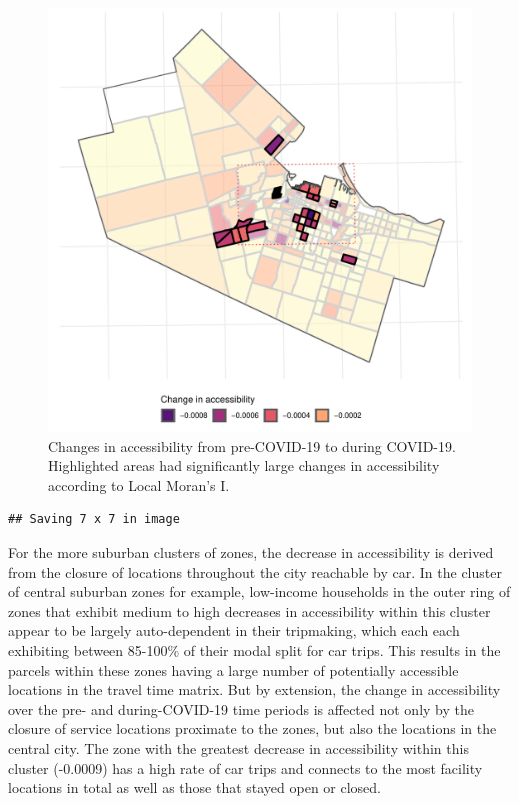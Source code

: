 \documentclass[]{elsarticle} %
\begin{document}
\begin{figure}
\includegraphics[width=1\linewidth]{Accessibility-Foodbanks-Hamilton_files/figure-latex/plot-local-i-1} \caption{\label{fig:accessibility-changes-with-local-i}Changes in accessibility from pre-COVID-19 to during COVID-19. Highlighted areas had significantly large changes in accessibility according to Local Moran's I.}\label{fig:plot-local-i}
\end{figure}

\begin{verbatim}
## Saving 7 x 7 in image
\end{verbatim}

For the more suburban clusters of zones, the decrease in accessibility
is derived from the closure of locations throughout the city reachable
by car. In the cluster of central suburban zones for example, low-income
households in the outer ring of zones that exhibit medium to high
decreases in accessibility within this cluster appear to be largely
auto-dependent in their tripmaking, which each each exhibiting between
85-100\% of their modal split for car trips. This results in the parcels
within these zones having a large number of potentially accessible
locations in the travel time matrix. But by extension, the change in
accessibility over the pre- and during-COVID-19 time periods is affected
not only by the closure of service locations proximate to the zones, but
also the locations in the central city. The zone with the greatest
decrease in accessibility within this cluster (-0.0009) has a high rate
of car trips and connects to the most facility locations in total as
well as those that stayed open or closed.
\end{document}

